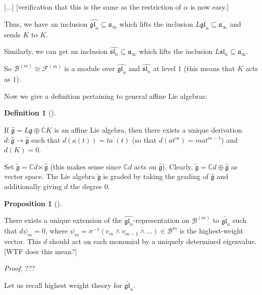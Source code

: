 \documentclass
[numbers=enddot,12pt,final,onecolumn,german,notitlepage]{scrartcl}%
\theoremstyle{definition}
\newtheorem{prop}[theo]{Proposition}
\newenvironment{proposition}[1][]
{\begin{prop}[#1]\begin{leftbar}}
{\end{leftbar}\end{prop}}
\newtheorem{defi}[theo]{Definition}
\newenvironment{definition}[1][]
{\begin{defi}[#1]\begin{leftbar}}
{\end{leftbar}\end{defi}}
\begin{document}
[...] [verification that this is the same as the restriction of $\alpha$ is
now easy.]

Thus, we have an inclusion $\widehat{\mathfrak{gl}_{n}}\subseteq
\mathfrak{a}_{\infty}$ which lifts the inclusion $L\mathfrak{gl}_{n}%
\subseteq\overline{\mathfrak{a}_{\infty}}$ and sends $K$ to $K$.

Similarly, we can get an inclusion $\widehat{\mathfrak{sl}_{n}}\subseteq
\mathfrak{a}_{\infty}$ which lifts the inclusion $L\mathfrak{sl}_{n}%
\subseteq\overline{\mathfrak{a}_{\infty}}$.

So $\mathcal{B}^{\left(  m\right)  }\cong\mathcal{F}^{\left(  m\right)  }$ is
a module over $\widehat{\mathfrak{gl}_{n}}$ and $\widehat{\mathfrak{sl}_{n}}$
at level $1$ (this means that $K$ acts as $1$).

Now we give a definition pertaining to general affine Lie algebras:

\begin{definition}
If $\widehat{\mathfrak{g}}=L\mathfrak{g}\oplus\mathbb{C}K$ is an affine Lie
algebra, then there exists a unique derivation $d:\widehat{\mathfrak{g}%
}\rightarrow\widehat{\mathfrak{g}}$ such that $d\left(  a\left(  t\right)
\right)  =ta^{\prime}\left(  t\right)  $ (so that $d\left(  at^{m}\right)
=mat^{m-1}$) and $d\left(  K\right)  =0$.

Set $\widetilde{\mathfrak{g}}=\mathbb{C}d\ltimes\widehat{\mathfrak{g}}$ (this
makes sense since $\mathbb{C}d$ acts on $\widehat{\mathfrak{g}}$). Clearly,
$\widetilde{\mathfrak{g}}=\mathbb{C}d\oplus\widehat{\mathfrak{g}}$ as vector
space. The Lie algebra $\widetilde{\mathfrak{g}}$ is graded by taking the
grading of $\widehat{\mathfrak{g}}$ and additionally giving $d$ the degree $0$.
\end{definition}

\begin{proposition}
There exists a unique extension of the $\widehat{\mathfrak{gl}_{n}}%
$-representation on $\mathcal{B}^{\left(  m\right)  }$ to
$\widetilde{\mathfrak{gl}_{n}}$ such that $d\psi_{m}=0$, where $\psi
_{m}=\sigma^{-1}\left(  v_{m}\wedge v_{m-1}\wedge...\right)  \in
\mathcal{B}^{m}$ is the highest-weight vector. This $d$ should act on each
monomial by a uniquely determined eigenvalue. [WTF does this mean?]
\end{proposition}

\textit{Proof.} ???

Let us recall highest weight theory for $\widetilde{\mathfrak{gl}_{n}}$.
\end{document}
